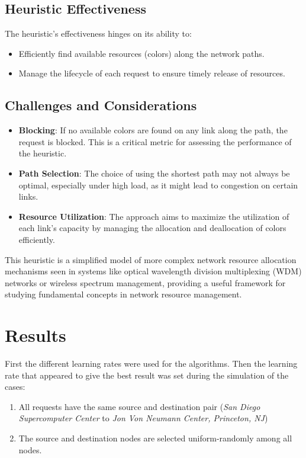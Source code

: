 \documentclass[conference]{IEEEtran}
\begin{document}
\subsection{Heuristic Effectiveness}
The heuristic's effectiveness hinges on its ability to:
\begin{itemize}
    \item Efficiently find available resources (colors) along the network paths.
    \item Manage the lifecycle of each request to ensure timely release of resources.
\end{itemize}

\subsection{Challenges and Considerations}
\begin{itemize}
    \item \textbf{Blocking}: If no available colors are found on any link along the path, the request is blocked. This is a critical metric for assessing the performance of the heuristic.
    \item \textbf{Path Selection}: The choice of using the shortest path may not always be optimal, especially under high load, as it might lead to congestion on certain links.
    \item \textbf{Resource Utilization}: The approach aims to maximize the utilization of each link's capacity by managing the allocation and deallocation of colors efficiently.
\end{itemize}

This heuristic is a simplified model of more complex network resource allocation mechanisms seen in systems like optical wavelength division multiplexing (WDM) networks or wireless spectrum management, providing a useful framework for studying fundamental concepts in network resource management.



\section{Results}
First the different learning rates were used for the algorithms. Then the learning rate that appeared to give the best result was set during the simulation of the cases:
\begin{enumerate}[label=\Roman*.]
    \item All requests have the same source and destination pair (\textit{San Diego Supercomputer Center} to \textit{Jon Von Neumann Center, Princeton, NJ})
    \item The source and destination nodes are selected uniform-randomly among all nodes.
\end{enumerate}
\end{document}
